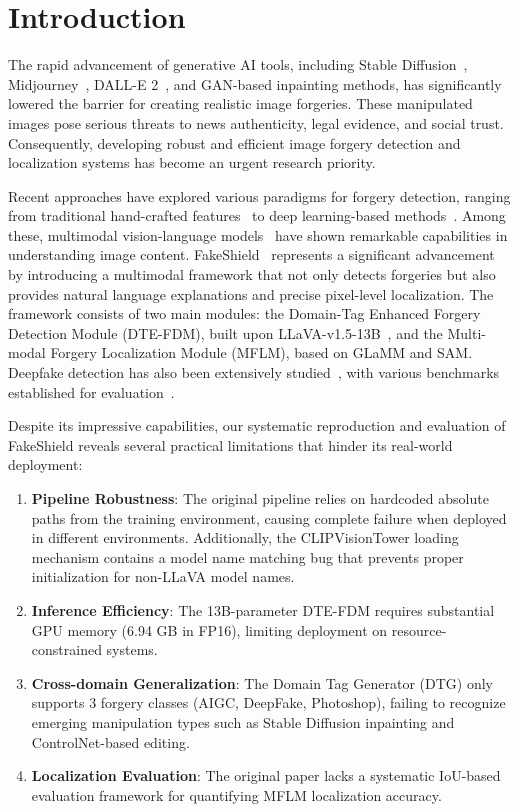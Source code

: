 \section{Introduction}

The rapid advancement of generative AI tools, including Stable Diffusion~\citep{stablediffusion}, Midjourney~\citep{midjourney}, DALL-E 2~\citep{dalle2}, and GAN-based inpainting methods, has significantly lowered the barrier for creating realistic image forgeries. These manipulated images pose serious threats to news authenticity, legal evidence, and social trust. Consequently, developing robust and efficient image forgery detection and localization systems has become an urgent research priority.

Recent approaches have explored various paradigms for forgery detection, ranging from traditional hand-crafted features~\citep{noise_pattern,compression_artifact} to deep learning-based methods~\citep{cnn_detection,transformer_detection,mantranet,mvss_net}. Among these, multimodal vision-language models~\citep{clip,llama,gpt4v,qwen_vl,instructblip} have shown remarkable capabilities in understanding image content. FakeShield~\citep{fakeshield2025} represents a significant advancement by introducing a multimodal framework that not only detects forgeries but also provides natural language explanations and precise pixel-level localization. The framework consists of two main modules: the Domain-Tag Enhanced Forgery Detection Module (DTE-FDM), built upon LLaVA-v1.5-13B~\citep{llava}, and the Multi-modal Forgery Localization Module (MFLM), based on GLaMM and SAM. Deepfake detection has also been extensively studied~\citep{deepfake_survey,faceforensics,cnnsport,dire}, with various benchmarks established for evaluation~\citep{imd2020,coverage,nist16}.

Despite its impressive capabilities, our systematic reproduction and evaluation of FakeShield reveals several practical limitations that hinder its real-world deployment:

\begin{enumerate}
    \item \textbf{Pipeline Robustness}: The original pipeline relies on hardcoded absolute paths from the training environment, causing complete failure when deployed in different environments. Additionally, the CLIPVisionTower loading mechanism contains a model name matching bug that prevents proper initialization for non-LLaVA model names.
    \item \textbf{Inference Efficiency}: The 13B-parameter DTE-FDM requires substantial GPU memory (6.94 GB in FP16), limiting deployment on resource-constrained systems.
    \item \textbf{Cross-domain Generalization}: The Domain Tag Generator (DTG) only supports 3 forgery classes (AIGC, DeepFake, Photoshop), failing to recognize emerging manipulation types such as Stable Diffusion inpainting and ControlNet-based editing.
    \item \textbf{Localization Evaluation}: The original paper lacks a systematic IoU-based evaluation framework for quantifying MFLM localization accuracy.
\end{enumerate}

